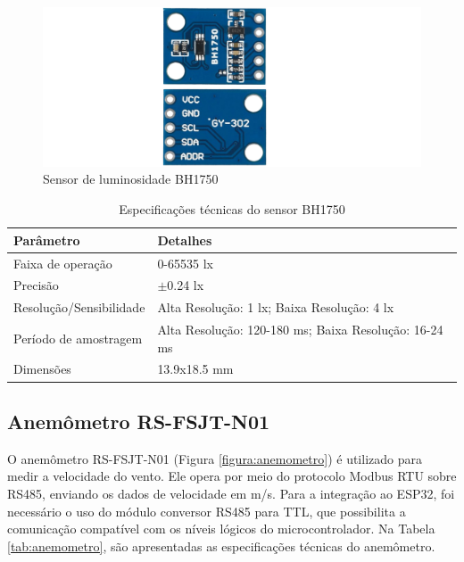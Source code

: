 \begin{figure}[!htb] \centering
  \caption{Sensor de luminosidade BH1750} \label{figura:bh1750}
  \begin{varwidth}{\linewidth}
    \includegraphics[width=16cm]{figuras/BH1750.png}
  \end{varwidth}
\end{figure}

\begin{table}[!htb]
    \caption{Especificações técnicas do sensor BH1750}
    \begin{tabularx}{\textwidth}{|X|X|} \hline
        \textbf{Parâmetro} & \textbf{Detalhes} \\ \hline
        Faixa de operação & 0-65535 lx \\ \hline
        Precisão & $\pm$0.24 lx  \\ \hline
        Resolução/Sensibilidade & Alta Resolução: 1 lx; Baixa Resolução: 4 lx \\ \hline
        Período de amostragem & Alta Resolução: 120-180 ms; Baixa Resolução: 16-24 ms \\ \hline
        Dimensões & 13.9x18.5 mm \\ \hline
    \end{tabularx}
    \label{tab:bh1750}
\end{table}

\subsection{Anemômetro RS-FSJT-N01}

O anemômetro RS-FSJT-N01 (Figura \ref{figura:anemometro}) é utilizado para medir a velocidade do vento. Ele opera por meio do protocolo Modbus RTU sobre RS485, enviando os dados de velocidade em m/s. Para a integração ao ESP32, foi necessário o uso do módulo conversor RS485 para TTL, que possibilita a comunicação compatível com os níveis lógicos do microcontrolador. Na Tabela \ref{tab:anemometro}, são apresentadas as especificações técnicas do anemômetro.

